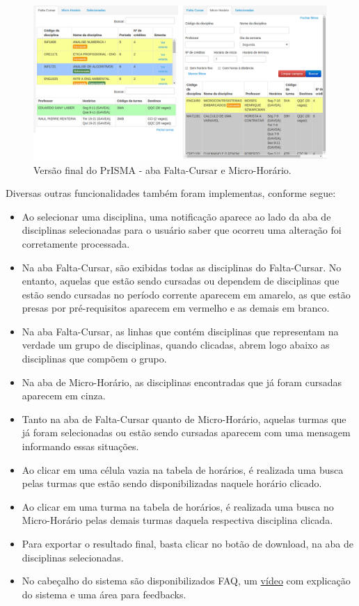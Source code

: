 \documentclass[graduacao,brazil]{ThesisPUC}
\begin{document}
\begin{figure}[H]
    \centering
    \includegraphics[width=\linewidth]{img/v3_abas.png}
    \caption{Versão final do PrISMA - aba Falta-Cursar e Micro-Horário.}
\end{figure}

Diversas outras funcionalidades também foram implementas, conforme segue:

\begin{itemize}

	\item Ao selecionar uma disciplina, uma notificação aparece ao lado da aba de disciplinas selecionadas para o usuário saber que ocorreu uma alteração foi corretamente processada.
	\item Na aba Falta-Cursar, são exibidas todas as disciplinas do Falta-Cursar. No entanto, aquelas que estão sendo cursadas ou dependem de disciplinas que estão sendo cursadas no período corrente aparecem em amarelo, as que estão presas por pré-requisitos aparecem em vermelho e as demais em branco.
	\item Na aba Falta-Cursar, as linhas que contém disciplinas que representam na verdade um grupo de disciplinas, quando clicadas, abrem logo abaixo as disciplinas que compõem o grupo.
	\item Na aba de Micro-Horário, as disciplinas encontradas que já foram cursadas aparecem em cinza.
	\item Tanto na aba de Falta-Cursar quanto de Micro-Horário, aquelas turmas que já foram selecionadas ou estão sendo cursadas aparecem com uma mensagem informando essas situações.
	\item Ao clicar em uma célula vazia na tabela de horários, é realizada uma busca pelas turmas que estão sendo disponibilizadas naquele horário clicado.
	\item Ao clicar em uma turma na tabela de horários, é realizada uma busca no Micro-Horário pelas demais turmas daquela respectiva disciplina clicada.
	\item Para exportar o resultado final, basta clicar no botão de download, na aba de disciplinas selecionadas.
	\item No cabeçalho do sistema são disponibilizados FAQ, um \href{https://www.youtube.com/watch?v=XHF8WOJ6xI0}{vídeo} com explicação do sistema e uma área para feedbacks.

\end{itemize}
\end{document}
